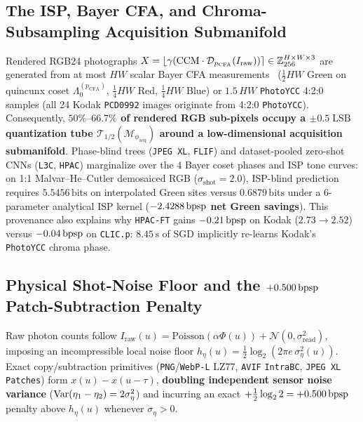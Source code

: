 \subsection{The ISP, Bayer CFA, and Chroma-Subsampling Acquisition Submanifold}
Rendered RGB24 photographs $X = \lfloor \gamma(\mathrm{CCM}\cdot \mathcal{D}_{p_{\mathrm{CFA}}}(I_{\mathrm{raw}})) \rceil \in \mathbb{Z}_{256}^{H\times W\times 3}$ are generated from at most $HW$ scalar Bayer CFA measurements~\citep{malvar2004demosaic} ($\frac{1}{2}HW$ Green on quincunx coset $\Lambda_0^{(p_{\mathrm{CFA}})}$, $\frac{1}{4}HW$ Red, $\frac{1}{4}HW$ Blue) or $1.5\,HW$ \texttt{PhotoYCC} 4:2:0 samples (all 24 Kodak \texttt{PCD0992} images originate from 4:2:0 \texttt{PhotoYCC}). Consequently, \textbf{$50\%\text{--}66.7\%$ of rendered RGB sub-pixels occupy a $\pm 0.5\;\mathrm{LSB}$ quantization tube $\mathcal{T}_{1/2}(\mathcal{M}_{\phi_{\mathrm{acq}}})$ around a low-dimensional acquisition submanifold}. Phase-blind trees (\texttt{JPEG~XL}, \texttt{FLIF}) and dataset-pooled zero-shot CNNs (\texttt{L3C}, \texttt{HPAC}) marginalize over the 4 Bayer coset phases and ISP tone curves: on 1:1 Malvar--He--Cutler demosaiced RGB ($\sigma_{\mathrm{shot}}=2.0$), ISP-blind prediction requires $5.5456\,\mathrm{bits}$ on interpolated Green sites versus $0.6879\,\mathrm{bits}$ under a 6-parameter analytical ISP kernel (\textbf{$-2.4288\,\mathrm{bpsp}$ net Green savings}). This provenance also explains why \texttt{HPAC-FT} gains $-0.21\,\mathrm{bpsp}$ on Kodak ($2.73\to 2.52$) versus $-0.04\,\mathrm{bpsp}$ on \texttt{CLIC.p}: $8.45\,\mathrm{s}$ of SGD implicitly re-learns Kodak's \texttt{PhotoYCC} chroma phase.

\subsection{Physical Shot-Noise Floor and the \texorpdfstring{$+0.500\,\mathrm{bpsp}$}{+0.500 bpsp} Patch-Subtraction Penalty}
Raw photon counts follow $I_{\mathrm{raw}}(u) = \mathrm{Poisson}(\alpha\Phi(u)) + \mathcal{N}(0,\sigma_{\mathrm{read}}^2)$, imposing an incompressible local noise floor $h_\eta(u) = \frac{1}{2}\log_2(2\pi e\,\sigma_\eta^2(u))$. Exact copy/subtraction primitives (\texttt{PNG}/\texttt{WebP-L} LZ77, \texttt{AVIF} \texttt{IntraBC}, \texttt{JPEG~XL} \texttt{Patches}) form $x(u) - x(u-\tau)$, \textbf{doubling independent sensor noise variance} ($\operatorname{Var}(\eta_1 - \eta_2) = 2\sigma_\eta^2$) and incurring an exact $+\frac{1}{2}\log_2 2 = +0.500\,\mathrm{bpsp}$ penalty above $h_\eta(u)$ whenever $\sigma_\eta > 0$.

